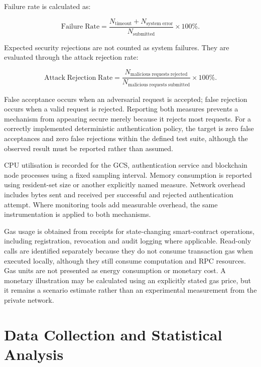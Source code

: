 Failure rate is calculated as:

\begin{equation}
    \mathrm{Failure\;Rate} = \frac{N_{\mathrm{timeout}} + N_{\mathrm{system\;error}}}{N_{\mathrm{submitted}}} \times 100\%.
\end{equation}

Expected security rejections are not counted as system failures. They are evaluated through the attack rejection rate:

\begin{equation}
    \mathrm{Attack\;Rejection\;Rate} = \frac{N_{\mathrm{malicious\;requests\;rejected}}}{N_{\mathrm{malicious\;requests\;submitted}}} \times 100\%.
\end{equation}

False acceptance occurs when an adversarial request is accepted; false rejection occurs when a valid request is rejected. Reporting both measures prevents a mechanism from appearing secure merely because it rejects most requests. For a correctly implemented deterministic authentication policy, the target is zero false acceptances and zero false rejections within the defined test suite, although the observed result must be reported rather than assumed.

CPU utilisation is recorded for the GCS, authentication service and blockchain node processes using a fixed sampling interval. Memory consumption is reported using resident-set size or another explicitly named measure. Network overhead includes bytes sent and received per successful and rejected authentication attempt. Where monitoring tools add measurable overhead, the same instrumentation is applied to both mechanisms.

Gas usage is obtained from receipts for state-changing smart-contract operations, including registration, revocation and audit logging where applicable. Read-only calls are identified separately because they do not consume transaction gas when executed locally, although they still consume computation and RPC resources. Gas units are not presented as energy consumption or monetary cost. A monetary illustration may be calculated using an explicitly stated gas price, but it remains a scenario estimate rather than an experimental measurement from the private network.

\section{Data Collection and Statistical Analysis}
\label{sec:data-analysis}

